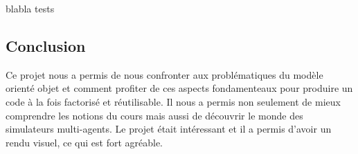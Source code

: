\documentclass [a4paper,11pt,titlepage] {article}
\begin{document}
blabla tests

\begin{center}
\section* {Conclusion }
\end{center}

Ce projet nous a permis de nous confronter aux problématiques du modèle orienté objet et comment profiter de ces aspects fondamenteaux pour produire un code à la fois factorisé et réutilisable. Il nous a permis non seulement de mieux comprendre les notions du cours
mais aussi de découvrir le monde des simulateurs multi-agents. Le
projet était intéressant et il a permis d’avoir un rendu visuel, ce qui est fort agréable.
\end{document}
